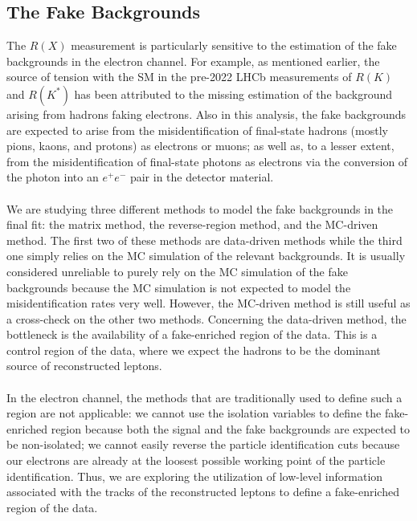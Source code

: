 \subsection{The Fake Backgrounds}
\label{subsec:the-fake-backgrounds}

The $R(X)$ measurement is particularly sensitive to the estimation of the fake backgrounds in the electron channel. %
For example, as mentioned earlier, the source of tension with the SM in the pre-2022 LHCb measurements of $R(K)$ and $R(K^{\ast})$ has been attributed to the missing estimation of the background arising from hadrons faking electrons. %
Also in this analysis, the fake backgrounds are expected to arise from the misidentification of final-state hadrons (mostly pions, kaons, and protons) as electrons or muons; as well as, to a lesser extent, from the misidentification of final-state photons as electrons via the conversion of the photon into an $e^+e^-$ pair in the detector material. %
\\\\
We are studying three different methods to model the fake backgrounds in the final fit: the matrix method, the reverse-region method, and the MC-driven method. %
The first two of these methods are data-driven methods while the third one simply relies on the MC simulation of the relevant backgrounds. %
It is usually considered unreliable to purely rely on the MC simulation of the fake backgrounds because the MC simulation is not expected to model the misidentification rates very well. %
However, the MC-driven method is still useful as a cross-check on the other two methods. %
Concerning the data-driven method, the bottleneck is the availability of a fake-enriched region of the data. %
This is a control region of the data, where we expect the hadrons to be the dominant source of reconstructed leptons. %
\\\\
In the electron channel, the methods that are traditionally used to define such a region are not applicable: we cannot use the isolation variables to define the fake-enriched region because both the signal and the fake backgrounds are expected to be non-isolated; we cannot easily reverse the particle identification cuts because our electrons are already at the loosest possible working point of the particle identification. %
Thus, we are exploring the utilization of low-level information associated with the tracks of the reconstructed leptons to define a fake-enriched region of the data. %
